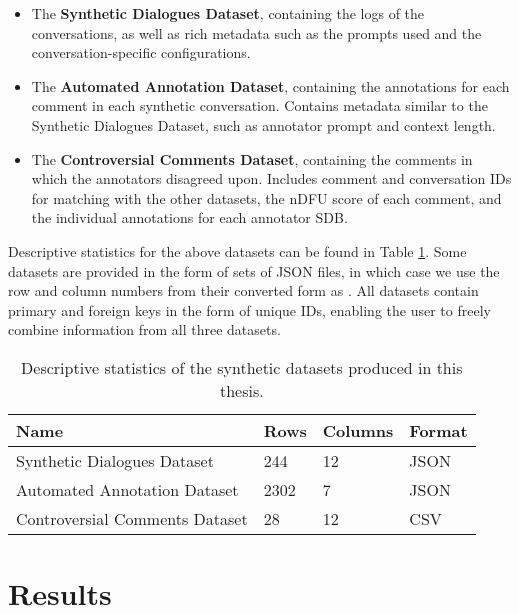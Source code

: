 \begin{itemize}
	\item The \textbf{Synthetic Dialogues Dataset}, containing the logs of the conversations, as well as rich metadata such as the prompts used and the conversation-specific configurations.
	
	\item The \textbf{Automated Annotation Dataset}, containing the annotations for each comment in each synthetic conversation. Contains metadata similar to the Synthetic Dialogues Dataset, such as annotator prompt and context length.
	
	\item The \textbf{Controversial Comments Dataset}, containing the comments in which the annotators disagreed upon. Includes comment and conversation IDs for matching with the other datasets, the \ac{nDFU} \cite{pavlopoulos-likas-2024-polarized} score of each comment, and the individual annotations for each annotator \ac{SDB}.
\end{itemize}

Descriptive statistics for the above datasets can be found in Table \ref{tab:datasets}. Some datasets are provided in the form of sets of \ac{JSON} files, in which case we use the row and column numbers from their converted form as . All datasets contain primary and foreign keys in the form of unique IDs, enabling the user to freely combine information from all three datasets.


\begin{table}
	\begin{tabular}
		{ |p{6cm}|p{1cm}|p{1.5cm}|p{2cm}|}
		\hline
		\cellcolor{blue!25}\textbf{Name} & \cellcolor{blue!25}\textbf{Rows} & \cellcolor{blue!25}\textbf{Columns} & \cellcolor{blue!25}\textbf{Format}\\
		\hline
		Synthetic Dialogues Dataset & 244 & 12 & JSON\\
		\hline
		Automated Annotation Dataset & 2302 & 7 & JSON\\
		\hline
		Controversial Comments Dataset & 28 & 12 & CSV\\
		\hline
	\end{tabular}
	\caption{Descriptive statistics of the synthetic datasets produced in this thesis.}
	\label{tab:datasets}
\end{table}


\section{Results}
\label{sec:evaluation:analysis}

